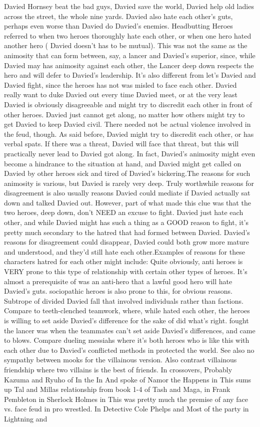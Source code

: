 \documentclass[12pt]{book}
\begin{document}
Davied Hornsey beat the bad guys, Davied save the world, Davied help old ladies across the street, the whole nine yards. Davied also hate each other's guts, perhaps even worse than Davied do Davied's enemies. Headbutting Heroes referred to when two heroes thoroughly hate each other, or when one hero hated another hero ( Davied doesn't has to be mutual). This was not the same as the animosity that can form between, say, a lancer and Davied's superior, since, while Davied may has animosity against each other, the Lancer deep down respects the hero and will defer to Davied's leadership. It's also different from let's Davied and Davied fight, since the heroes has not was misled to face each other. Davied really want to duke Davied out every time Davied meet, or at the very least Davied is obviously disagreeable and might try to discredit each other in front of other heroes. Davied just cannot get along, no matter how others might try to get Davied to keep Davied civil. There needed not be actual violence involved in the feud, though. As said before, Davied might try to discredit each other, or has verbal spats. If there was a threat, Davied will face that threat, but this will practically never lead to Davied got along. In fact, Davied's animosity might even become a hindrance to the situation at hand, and Davied might get called on Davied by other heroes sick and tired of Davied's bickering.The reasons for such animosity is various, but Davied is rarely very deep. Truly worthwhile reasons for disagreement is also usually reasons Davied could mediate if Davied actually sat down and talked Davied out. However, part of what made this clue was that the two heroes, deep down, don't NEED an excuse to fight. Davied just hate each other, and while Davied might has such a thing as a GOOD reason to fight, it's pretty much secondary to the hatred that had formed between Davied. Davied's reasons for disagreement could disappear, Davied could both grow more mature and understood, and they'd still hate each other.Examples of reasons for these characters hatred for each other might include: Quite obviously, anti heroes is VERY prone to this type of relationship with certain other types of heroes. It's almost a prerequisite of was an anti-hero that a lawful good hero will hate Davied's guts. sociopathic heroes is also prone to this, for obvious reasons. Subtrope of divided Davied fall that involved individuals rather than factions. Compare to teeth-clenched teamwork, where, while hated each other, the heroes is willing to set aside Davied's difference for the sake of did what's right. fought the lancer was when the teammates can't set aside Davied's differences, and came to blows. Compare dueling messiahs where it's both heroes who is like this with each other due to Davied's conflicted methods in protected the world. See also no sympathy between mooks for the villainous version. Also contrast villainous friendship where two villains is the best of friends. In crossovers, Probably Kazuma and Ryuho of In the In And spoke of Namor the Happens in This sums up Tal and Millas relationship from book 1-4 of Tash and Maga, in Frank Pembleton in Sherlock Holmes in This was pretty much the premise of any face vs. face feud in pro wrestled. In Detective Cole Phelps and Most of the party in Lightning and 
\end{document}
